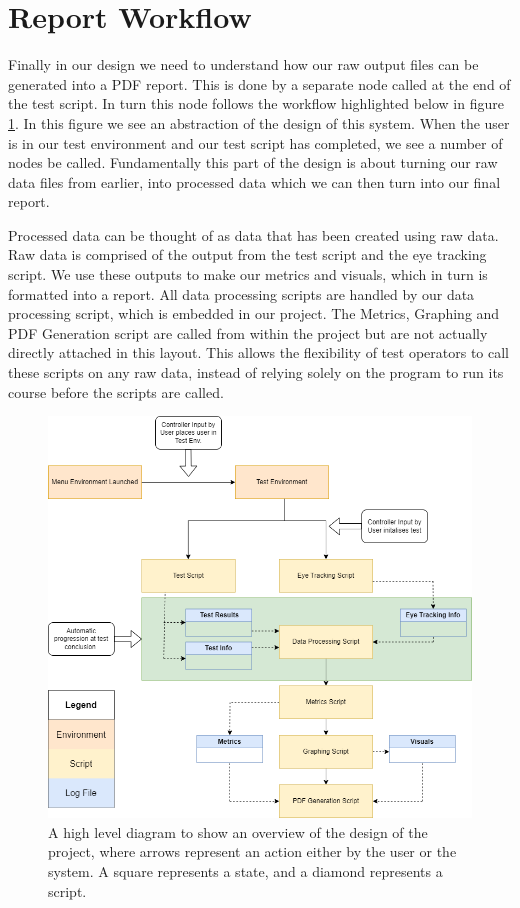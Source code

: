 \documentclass{l4proj}
\begin{document}
\section{Report Workflow} \label{design-wf}
Finally in our design we need to understand how our raw output files can be generated into a PDF report. This is done by a separate node called at the end of the test script. In turn this node follows the workflow highlighted below in figure \ref{fig:Design_Workflow}. 
In this figure we see an abstraction of the design of this system. When the user is in our test environment and our test script has completed, we see a number of nodes be called. Fundamentally this part of the design is about turning our raw data files from earlier, into processed data which we can then turn into our final report.

Processed data can be thought of as data that has been created using raw data. Raw data is comprised of the output from the test script and the eye tracking script. We use these outputs to make our metrics and visuals, which in turn is formatted into a report. All data processing scripts are handled by our data processing script, which is embedded in our project. The Metrics, Graphing and PDF Generation script are called from within the project but are not actually directly attached in this layout. This allows the flexibility of test operators to call these scripts on any raw data, instead of relying solely on the program to run its course before the scripts are called.
\newpage \begin{figure}[htbp]
    \centering
    \includegraphics[width=1\linewidth]{dissertation/images/Design_Workflow.png}    

    \caption{A high level diagram to show an overview of the design of the project, where arrows represent an action either by the user or the system. A square represents a state, and a diamond represents a script. 
    }

    \label{fig:Design_Workflow} 
\end{figure}
\end{document}

